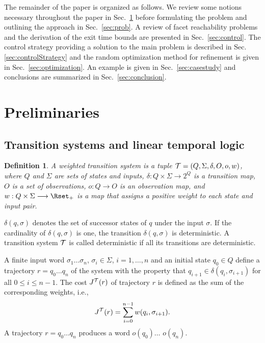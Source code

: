 \documentclass{ifacconf}
\newtheorem{definition}{Definition}
\newcommand{\TS}{{\cal T}}
\begin{document}
The remainder of the paper is organized as follows. We review some notions necessary throughout the paper in Sec.~\ref{sec:pre} before formulating the problem and outlining the approach in Sec.~\ref{sec:prob}. 
A review of facet reachability problems and the derivation of the exit time bounds are presented in Sec.~\ref{sec:control}. 
The control strategy providing a solution to the main problem is described in Sec.\ref{sec:controlStrategy} and the random optimization method for refinement is given in Sec.~\ref{sec:optimization}. 
An example is given in Sec.~\ref{sec:casestudy} and conclusions are summarized in Sec.~\ref{sec:conclusion}.




\section{Preliminaries}\label{sec:pre}

\subsection{Transition systems and linear temporal logic}
\begin{definition}
A weighted transition system is a tuple $\TS=(Q, \Sigma, \delta, O, o, w)$, where $Q$ and $\Sigma$ are sets of states and inputs, $\delta: Q \times \Sigma \longrightarrow 2^Q$ is a transition map, $O$ is a set of observations, $o:Q \longrightarrow O$ is an observation map, and $w : Q \times \Sigma \longrightarrow \Rset_+$ is a map that assigns a positive weight to each state and input pair.
\end{definition}

$\delta(q,\sigma)$ denotes the set of successor states of $q$ under the input $\sigma$. If the cardinality of $\delta(q,\sigma)$ is one, the transition $\delta(q,\sigma)$ is deterministic. A transition system $\TS$ is called deterministic if all its transitions are deterministic.

A finite input word $\sigma_1 \ldots \sigma_n$, $\sigma_i\in\Sigma$, $i=1,\ldots,n$ and an initial state $q_0 \in Q$ define a trajectory $r=q_0 \ldots q_n$ of the system with the property that $q_{i+1} \in \delta(q_i, \sigma_{i+1})$ for all $0 \leq i \leq n-1$. The cost $J^{\TS}(r)$ of trajectory $r$ is defined as the sum of the corresponding weights, i.e., 
\[
J^{\TS}(r) = \sum_{i=0}^{n-1} w(q_i, \sigma_{i+1}).
\]
A trajectory $r=q_0\ldots q_n$ produces a word $o(q_0)\ldots$ $o(q_n)$.
\end{document}
